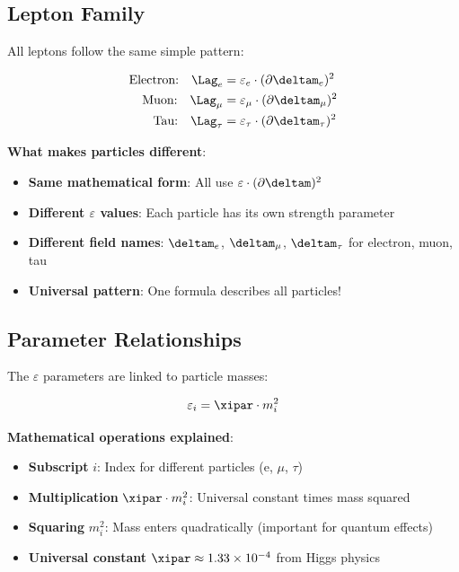 	\subsection{Lepton Family}
	
	All leptons follow the same simple pattern:
	
	\begin{align}
		\text{Electron:} \quad \Lag_e &= \varepsilon_e \cdot (\partial \deltam_e)^2 \\
		\text{Muon:} \quad \Lag_{\mu} &= \varepsilon_{\mu} \cdot (\partial \deltam_{\mu})^2 \\
		\text{Tau:} \quad \Lag_{\tau} &= \varepsilon_{\tau} \cdot (\partial \deltam_{\tau})^2
	\end{align}
	
	\textbf{What makes particles different}:
	\begin{itemize}
		\item \textbf{Same mathematical form}: All use $\varepsilon \cdot (\partial \deltam)^2$
		\item \textbf{Different $\varepsilon$ values}: Each particle has its own strength parameter
		\item \textbf{Different field names}: $\deltam_e$, $\deltam_{\mu}$, $\deltam_{\tau}$ for electron, muon, tau
		\item \textbf{Universal pattern}: One formula describes all particles!
	\end{itemize}
	
	\subsection{Parameter Relationships}
	
	The $\varepsilon$ parameters are linked to particle masses:
	
	\begin{equation}
		\varepsilon_i = \xipar \cdot m_i^2
		\label{eq:epsilon_mass_relation}
	\end{equation}
	
	\textbf{Mathematical operations explained}:
	\begin{itemize}
		\item \textbf{Subscript} $i$: Index for different particles (e, $\mu$, $\tau$)
		\item \textbf{Multiplication} $\xipar \cdot m_i^2$: Universal constant times mass squared
		\item \textbf{Squaring} $m_i^2$: Mass enters quadratically (important for quantum effects)
		\item \textbf{Universal constant} $\xipar \approx 1.33 \times 10^{-4}$ from Higgs physics
	\end{itemize}
	
